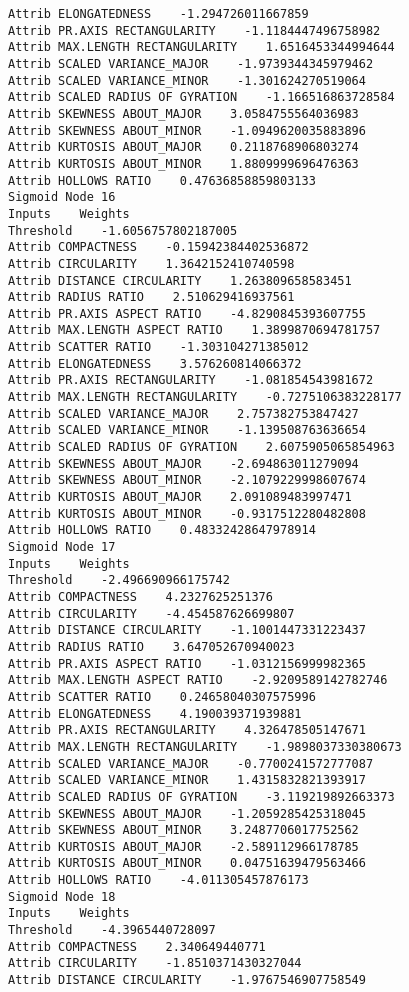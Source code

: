\documentclass[
	article,			%
	11pt,				%
	oneside,			%
	a4paper,			%
	english,			%
	brazil,				%
	sumario=tradicional
	]{abntex2}
\begin{document}
\begin{lstlisting}
Attrib ELONGATEDNESS    -1.294726011667859
Attrib PR.AXIS RECTANGULARITY    -1.1184447496758982
Attrib MAX.LENGTH RECTANGULARITY    1.6516453344994644
Attrib SCALED VARIANCE_MAJOR    -1.9739344345979462
Attrib SCALED VARIANCE_MINOR    -1.301624270519064
Attrib SCALED RADIUS OF GYRATION    -1.166516863728584
Attrib SKEWNESS ABOUT_MAJOR    3.0584755564036983
Attrib SKEWNESS ABOUT_MINOR    -1.0949620035883896
Attrib KURTOSIS ABOUT_MAJOR    0.2118768906803274
Attrib KURTOSIS ABOUT_MINOR    1.8809999696476363
Attrib HOLLOWS RATIO    0.47636858859803133
Sigmoid Node 16
Inputs    Weights
Threshold    -1.6056757802187005
Attrib COMPACTNESS    -0.15942384402536872
Attrib CIRCULARITY    1.3642152410740598
Attrib DISTANCE CIRCULARITY    1.263809658583451
Attrib RADIUS RATIO    2.510629416937561
Attrib PR.AXIS ASPECT RATIO    -4.8290845393607755
Attrib MAX.LENGTH ASPECT RATIO    1.3899870694781757
Attrib SCATTER RATIO    -1.303104271385012
Attrib ELONGATEDNESS    3.576260814066372
Attrib PR.AXIS RECTANGULARITY    -1.081854543981672
Attrib MAX.LENGTH RECTANGULARITY    -0.7275106383228177
Attrib SCALED VARIANCE_MAJOR    2.757382753847427
Attrib SCALED VARIANCE_MINOR    -1.139508763636654
Attrib SCALED RADIUS OF GYRATION    2.6075905065854963
Attrib SKEWNESS ABOUT_MAJOR    -2.694863011279094
Attrib SKEWNESS ABOUT_MINOR    -2.1079229998607674
Attrib KURTOSIS ABOUT_MAJOR    2.091089483997471
Attrib KURTOSIS ABOUT_MINOR    -0.9317512280482808
Attrib HOLLOWS RATIO    0.48332428647978914
Sigmoid Node 17
Inputs    Weights
Threshold    -2.496690966175742
Attrib COMPACTNESS    4.2327625251376
Attrib CIRCULARITY    -4.454587626699807
Attrib DISTANCE CIRCULARITY    -1.1001447331223437
Attrib RADIUS RATIO    3.647052670940023
Attrib PR.AXIS ASPECT RATIO    -1.0312156999982365
Attrib MAX.LENGTH ASPECT RATIO    -2.9209589142782746
Attrib SCATTER RATIO    0.24658040307575996
Attrib ELONGATEDNESS    4.190039371939881
Attrib PR.AXIS RECTANGULARITY    4.326478505147671
Attrib MAX.LENGTH RECTANGULARITY    -1.9898037330380673
Attrib SCALED VARIANCE_MAJOR    -0.7700241572777087
Attrib SCALED VARIANCE_MINOR    1.4315832821393917
Attrib SCALED RADIUS OF GYRATION    -3.119219892663373
Attrib SKEWNESS ABOUT_MAJOR    -1.2059285425318045
Attrib SKEWNESS ABOUT_MINOR    3.2487706017752562
Attrib KURTOSIS ABOUT_MAJOR    -2.589112966178785
Attrib KURTOSIS ABOUT_MINOR    0.04751639479563466
Attrib HOLLOWS RATIO    -4.011305457876173
Sigmoid Node 18
Inputs    Weights
Threshold    -4.3965440728097
Attrib COMPACTNESS    2.340649440771
Attrib CIRCULARITY    -1.8510371430327044
Attrib DISTANCE CIRCULARITY    -1.9767546907758549

\end{lstlisting}
\end{document}
